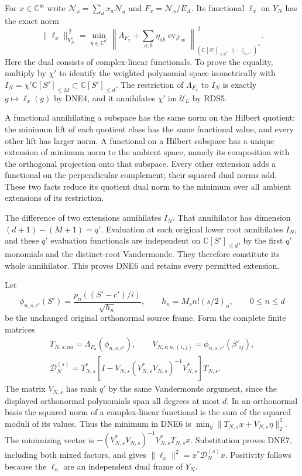 \documentclass[11pt,a4paper]{article}
\begin{document}
For $x\in\mathbb C^{\mathfrak m}$ write
$\mathcal N_x=\sum_a x_a\mathcal N_a$ and
$F_x=\mathcal N_x/E_A$. Its functional $\ell_x$ on $Y_N$
has the exact norm
\[
 \|\ell_x\|_{Y_N^\vee}^{\,2}
 =\min_{\eta\in\mathbb C^{q'}}
   \left\|\Lambda_{F_x}
          +\sum_{a,b}\eta_{ab}\operatorname{ev}_{\beta'_{ab}}
   \right\|_{(\mathbb C[S']_{\le d},\,\|\cdot\|_{s,c'})^\vee}^{\,2}.
 \tag{DNE6}
\]
Here the dual consists of complex-linear functionals.
To prove the equality, multiply by $\chi'$ to identify the
weighted polynomial space isometrically with
$I_N=\chi'\mathbb C[S']_{\le M}\subset\mathbb C[S']_{\le d}$.
The restriction of $\Lambda_{F_x}$ to $I_N$ is exactly
$g\mapsto\ell_x(g)$ by DNE4, and it annihilates
$\chi'\operatorname{im}\mathcal U_L$ by RDS5.

A functional annihilating a subspace has the same norm on
the Hilbert quotient: the minimum lift of each quotient
class has the same functional value, and every other lift
has larger norm. A functional on a Hilbert subspace has a
unique extension of minimum norm to the ambient space,
namely its composition with the orthogonal projection onto
that subspace. Every other extension adds a functional on
the perpendicular complement; their squared dual norms add.
These two facts reduce its quotient dual norm to the
minimum over all ambient extensions of its restriction.

The difference of two extensions annihilates $I_N$.
That annihilator has dimension
$(d+1)-(M+1)=q'$. Evaluation at each original lower root
annihilates $I_N$, and these $q'$ evaluation functionals are
independent on $\mathbb C[S']_{\le d}$, by the first $q'$
monomials and the distinct-root Vandermonde. They therefore
constitute its whole annihilator. This proves DNE6 and
retains every permitted extension.

Let
\[
 \phi_{n,s,c'}(S')
 =\frac{p_n((S'-c')/i)}{\sqrt{h_n}},\qquad
 h_n=M_sn!(s/2)_n,\qquad 0\le n\le d
\]
be the unchanged original orthonormal source frame. Form the
complete finite matrices
\[
 \begin{gathered}
 T_{N,s;na}=\Lambda_{F_a}(\phi_{n,s,c'}),\qquad
 V_{N,s;n,(i,j)}=\phi_{n,s,c'}(\beta'_{ij}),\\
 \mathcal D_N^{(s)}
 =T_{N,s}^*
  \left[I-V_{N,s}(V_{N,s}^*V_{N,s})^{-1}V_{N,s}^*\right]T_{N,s}.
 \end{gathered}
 \tag{DNE7}
\]
The matrix $V_{N,s}$ has rank $q'$ by the same Vandermonde
argument, since the displayed orthonormal polynomials span
all degrees at most $d$. In an orthonormal basis the squared
norm of a complex-linear functional is the sum of the
squared moduli of its values. Thus the minimum in DNE6 is
$\min_\eta\|T_{N,s}x+V_{N,s}\eta\|_2^2$.
The minimizing vector is
$-(V_{N,s}^*V_{N,s})^{-1}V_{N,s}^*T_{N,s}x$.
Substitution proves DNE7, including both mixed factors,
and gives $\|\ell_x\|^2=x^*\mathcal D_N^{(s)}x$.
Positivity follows because the $\ell_a$ are an independent
dual frame of $Y_N$.
\end{document}
